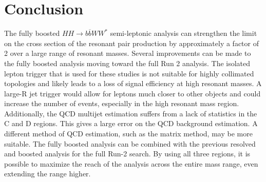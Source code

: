 \section{Conclusion}
The fully boosted ${HH\rightarrow b\overline{b}WW^{*}}$ semi-leptonic analysis can strengthen the limit on the cross section of the resonant pair production by approximately a factor of 2 over a large range of resonant masses. \newline
\indent Several improvements can be made to the fully boosted analysis moving toward the full Run 2 analysis. The isolated lepton trigger that is used for these studies is not suitable for highly collimated topologies and likely leads to a loss of signal efficiency at high resonant masses. A large-R jet trigger would allow for leptons much closer to other objects and could increase the number of events, especially in the high resonant mass region. Additionally, the QCD multijet estimation suffers from a lack of statistics in the C and D regions. This gives a large error on the QCD background estimation. A different method of QCD estimation, such as the matrix method, may be more suitable.\newline
\indent The fully boosted analysis can be combined with the previous resolved and boosted analysis for the full Run-2 search. By using all three regions, it is possible to maximize the reach of the analysis across the entire mass range, even extending the range higher. 


